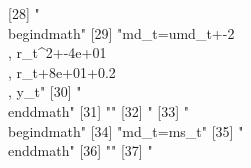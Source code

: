 [28] "\\begin{dmath}"                                                                                                                                                                                                                        
[29] "{md_{t}}={umd_{t}}+-2\\, {r_{t}}^{2}+-4e+01\\, {r_{t}}+8e+01+0.2\\, {y_{t}}"                                                                                                                                                           
[30] "\\end{dmath}"                                                                                                                                                                                                                          
[31] ""                                                                                                                                                                                                                                      
[32] "%
[33] "\\begin{dmath}"                                                                                                                                                                                                                        
[34] "{md_{t}}={ms_{t}}"                                                                                                                                                                                                                     
[35] "\\end{dmath}"                                                                                                                                                                                                                          
[36] ""                                                                                                                                                                                                                                      
[37] "%
